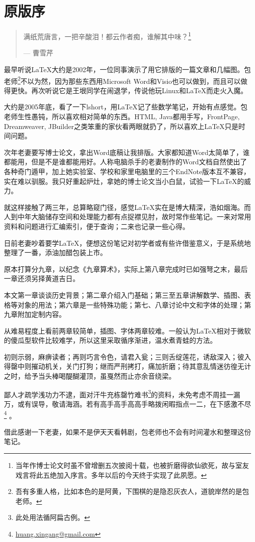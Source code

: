 \chapter{原版序}

\begin{quotation}
满纸荒唐言，一把辛酸泪！都云作者痴，谁解其中味？\footnote{当年作博士论文时虽不曾增删五次披阅十载，也被折磨得欲仙欲死，故与室友戏言将此五绝加入序言。多年以后的今天终于实现了此夙愿。}
\begin{flushright}
    --- 曹雪芹
\end{flushright}
\end{quotation}

最早听说\LaTeX{}大约是2002年，一位同事演示了用它排版的一篇文章和几幅图。包老师\footnote{吾有多重人格，比如本色的是阿黄，下围棋的是隐忍灰衣人，道貌岸然的是包老师。}不以为然，因为那些东西用Microsoft Word和Visio也可以做到，而且可以做得更快。再次听说它是王垠同学在闹退学，传说他玩Linux和\LaTeX{}而走火入魔。

大约是2005年底，看了一下lshort，用\LaTeX{}记了些数学笔记，开始有点感觉。包老师生性愚钝，所以喜欢相对简单的东西。HTML, Java都用手写，FrontPage, Dreamweaver, JBuilder之类笨重的家伙看两眼就扔了，所以喜欢上\LaTeX{}只是时间问题。

次年老妻要写博士论文，拿出Word底稿让我排版。大家都知道Word太简单了，谁都能用，但是不是谁都能用好。人称电脑杀手的老妻制作的Word文档自然使出了各种奇门遁甲，加上她实验室、学校和家里电脑里的三个EndNote版本互不兼容，实在难以驯服。我只好重起炉灶，拿她的博士论文当小白鼠，试验一下\LaTeX{}的威力。

就这样接触了两三年，总算略窥门径，感觉\LaTeX{}实在是博大精深，浩如烟海。而人到中年大脑储存空间和处理能力都有点捉襟见肘，故时常作些笔记。一来对常用资料和问题进行汇编索引，便于查询；二来也记录一些心得。

日前老妻吵着要学\LaTeX{}，便想这份笔记对初学者或有些许借鉴意义，于是系统地整理了一番，添油加醋包装上市。

原本打算分九章，以纪念《九章算术》，实际上第八章完成时已如强弩之末，最后一章还须另择黄道吉日。

本文第一章谈谈历史背景；第二章介绍入门基础；第三至五章讲解数学、插图、表格等对象的用法；第六章是一些特殊功能；第七、八章讨论中文和字体的处理；第九章附加定制内容。

从难易程度上看前两章较简单，插图、字体两章较难。一般认为\LaTeX{}相对于微软的傻瓜型软件比较难学，所以这里采取循序渐进，温水煮青蛙的方法。

初则示弱，麻痹读者；再则巧言令色，请君入瓮；三则舌绽莲花，诱敌深入；彼入得罄中则摧动机关，关门打狗；继而严刑拷打，痛加折磨；待其意乱情迷彷徨无计之时，给予当头棒喝醍醐灌顶，虽戛然而止亦余音绕梁。

鄙人才疏学浅功力不逮，面对汗牛充栋罄竹难书\footnote{此处用法循阿扁古例。}的资料，未免考虑不周挂一漏万，或有误导，敬请海涵。若有高手高手高高手略拨闲暇指点一二，在下感激不尽\footnote{\href{mailto:huang.xingang@gmail.com}{huang.xingang@gmail.com}}
。

借此感谢一下老妻，如果不是伊天天看韩剧，包老师也不会有时间灌水和整理这份笔记。
